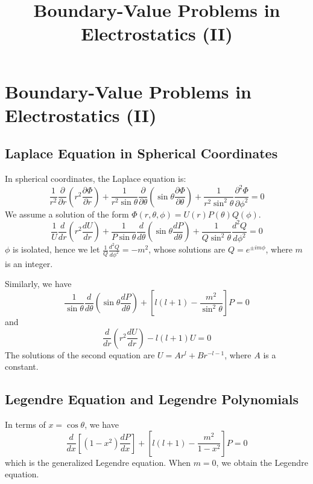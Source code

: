 \documentclass{article}
\title{Boundary-Value Problems in Electrostatics (II)}
\author{}
\date{}
\begin{document}
	\maketitle
	
	\section{Boundary-Value Problems in Electrostatics (II)}
	
	\subsection{Laplace Equation in Spherical Coordinates}
	In spherical coordinates, the Laplace equation is:
	\begin{equation}
		\frac{1}{r^2}\frac{\partial}{\partial r}\left(r^2 \frac{\partial \Phi}{\partial r}\right) + \frac{1}{r^2\sin\theta}\frac{\partial}{\partial \theta}\left(\sin\theta \frac{\partial \Phi}{\partial \theta}\right) + \frac{1}{r^2\sin^2\theta}\frac{\partial^2 \Phi}{\partial \phi^2} = 0
	\end{equation}
	We assume a solution of the form $\Phi(r, \theta, \phi) = U(r)P(\theta)Q(\phi)$.
	\begin{equation}
		\frac{1}{U}\frac{d}{dr}\left(r^2 \frac{dU}{dr}\right) + \frac{1}{P\sin\theta}\frac{d}{d\theta}\left(\sin\theta \frac{dP}{d\theta}\right) + \frac{1}{Q\sin^2\theta}\frac{d^2Q}{d\phi^2} = 0
	\end{equation}
	$\phi$ is isolated, hence we let $\frac{1}{Q}\frac{d^2Q}{d\phi^2} = -m^2$, whose solutions are $Q = e^{\pm im\phi}$, where $m$ is an integer.
	
	Similarly, we have
	\begin{equation}
		\frac{1}{\sin\theta}\frac{d}{d\theta}\left(\sin\theta \frac{dP}{d\theta}\right) + \left[l(l+1) - \frac{m^2}{\sin^2\theta}\right]P = 0
	\end{equation}
	and
	\begin{equation}
		\frac{d}{dr}\left(r^2 \frac{dU}{dr}\right) - l(l+1)U = 0
	\end{equation}
	The solutions of the second equation are $U = Ar^l + Br^{-l-1}$, where $A$ is a constant.
	
	\subsection{Legendre Equation and Legendre Polynomials}
	In terms of $x = \cos\theta$, we have
	\begin{equation}
		\frac{d}{dx}\left[(1-x^2)\frac{dP}{dx}\right] + \left[l(l+1) - \frac{m^2}{1-x^2}\right]P = 0
	\end{equation}
	which is the generalized Legendre equation.
	When $m=0$, we obtain the Legendre equation.
	
\end{document}
